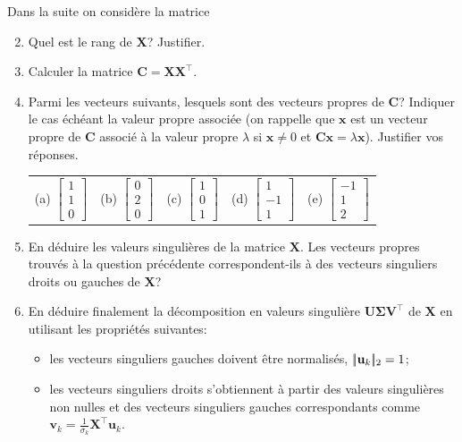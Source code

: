 Dans la suite on considère la matrice

\begin{enumerate}
	\setcounter{enumi}{1}
	\item Quel est le rang de $\mathbf{X}$? Justifier.
	\item Calculer la matrice $\mathbf{C} = \mathbf{X}\mathbf{X}^\top$.
	\item Parmi les vecteurs suivants, lesquels sont des vecteurs propres de $\mathbf{C}$? Indiquer le cas échéant la valeur propre associée (on rappelle que $\mathbf{x}$ est un vecteur propre de $\mathbf{C}$ associé à la valeur propre $\lambda$ si $\mathbf{x}\neq 0$ et $\mathbf{C}\mathbf{x} = \lambda \mathbf{x}$). Justifier vos réponses.
	
	\begin{tabular}{lllll}
		(a) $\begin{bmatrix} 1 \\ 1 \\ 0 \end{bmatrix}$ & (b) $\begin{bmatrix} 0 \\ 2 \\ 0 \end{bmatrix}$ & (c) $\begin{bmatrix} 1 \\ 0 \\ 1 \end{bmatrix}$ & (d) $\begin{bmatrix} 1 \\ -1 \\ 1 \end{bmatrix}$ & (e) $\begin{bmatrix} -1 \\ 1 \\ 2 \end{bmatrix}$
	\end{tabular}
	
	\item En déduire les valeurs singulières de la matrice $\mathbf{X}$. Les vecteurs propres trouvés à la question précédente correspondent-ils à des vecteurs singuliers droits ou gauches de $\mathbf{X}$?
	\item En déduire finalement la décomposition en valeurs singulière $\mathbf{U}\mathbf{\Sigma}\mathbf{V}^\top$ de $\mathbf{X}$ en utilisant les propriétés suivantes:
	\begin{itemize}
		\item[-] les vecteurs singuliers gauches doivent être normalisés, \ie $|\!| \mathbf{u}_k |\!|_2 = 1$;
		\item[-] les vecteurs singuliers droits s'obtiennent à partir des valeurs singulières non nulles et des vecteurs singuliers gauches correspondants comme $\mathbf{v}_k = \frac{1}{\sigma_k}\mathbf{X}^\top \mathbf{u}_k$.
	\end{itemize}
\end{enumerate}



